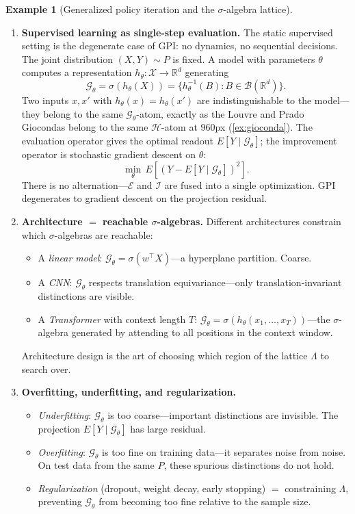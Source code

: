 \documentclass[12pt]{amsart}
\theoremstyle{definition}
\newtheorem{example}[theorem]{Example}
\theoremstyle{remark}
\newcommand{\R}{\mathbb{R}}
\begin{document}
\begin{example}[Generalized policy iteration and the $\sigma$-algebra lattice]
\begin{enumerate}[label=(\alph*)]
\item \textbf{Supervised learning as single-step evaluation.} The static supervised setting is the degenerate case of GPI: no dynamics, no sequential decisions. The joint distribution $(X, Y) \sim P$ is fixed. A model with parameters $\theta$ computes a representation $h_\theta : \mathcal{X} \to \R^d$ generating
\[
\mathcal{G}_\theta = \sigma(h_\theta(X)) = \{h_\theta^{-1}(B) : B \in \mathcal{B}(\R^d)\}.
\]
Two inputs $x, x'$ with $h_\theta(x) = h_\theta(x')$ are indistinguishable to the model---they belong to the same $\mathcal{G}_\theta$-atom, exactly as the Louvre and Prado Giocondas belong to the same $\mathcal{H}$-atom at 960px (\cref{ex:gioconda}). The evaluation operator gives the optimal readout $E[Y \mid \mathcal{G}_\theta]$; the improvement operator is stochastic gradient descent on $\theta$:
\begin{equation}\label{eq:ml-fundamental}
\min_\theta\, E[(Y - E[Y \mid \mathcal{G}_\theta])^2].
\end{equation}
There is no alternation---$\mathcal{E}$ and $\mathcal{I}$ are fused into a single optimization. GPI degenerates to gradient descent on the projection residual.

\item \textbf{Architecture $=$ reachable $\sigma$-algebras.} Different architectures constrain which $\sigma$-algebras are reachable:
\begin{itemize}
\item A \emph{linear model}: $\mathcal{G}_\theta = \sigma(w^\top X)$---a hyperplane partition. Coarse.
\item A \emph{CNN}: $\mathcal{G}_\theta$ respects translation equivariance---only translation-invariant distinctions are visible.
\item A \emph{Transformer} with context length $T$: $\mathcal{G}_\theta = \sigma(h_\theta(x_1, \ldots, x_T))$---the $\sigma$-algebra generated by attending to all positions in the context window.
\end{itemize}
Architecture design is the art of choosing which region of the lattice $\Lambda$ to search over.

\item \textbf{Overfitting, underfitting, and regularization.}
\begin{itemize}
\item \emph{Underfitting}: $\mathcal{G}_\theta$ is too coarse---important distinctions are invisible. The projection $E[Y \mid \mathcal{G}_\theta]$ has large residual.
\item \emph{Overfitting}: $\mathcal{G}_\theta$ is too fine on training data---it separates noise from noise. On test data from the same $P$, these spurious distinctions do not hold.
\item \emph{Regularization} (dropout, weight decay, early stopping) $=$ constraining $\Lambda$, preventing $\mathcal{G}_\theta$ from becoming too fine relative to the sample size.
\end{itemize}


\end{enumerate}
\end{example}
\end{document}
